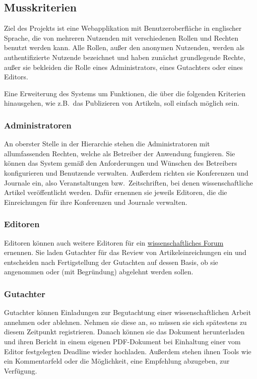 
\subsection{Musskriterien}
Ziel des Projekts ist eine Webapplikation mit Benutzeroberfläche in englischer Sprache, die von mehreren Nutzenden mit verschiedenen Rollen und Rechten benutzt werden kann.
Alle Rollen, außer den anonymen Nutzenden, werden als authentifizierte Nutzende bezeichnet und haben zunächst grundlegende Rechte, außer sie bekleiden die Rolle eines Administrators, eines Gutachters oder eines Editors.

Eine Erweiterung des Systems um Funktionen, die über die folgenden Kriterien hinausgehen, wie z.B.\ das Publizieren von Artikeln, soll einfach möglich sein.

\subsubsection{Administratoren}
An oberster Stelle in der Hierarchie stehen die Administratoren mit allumfassenden Rechten, welche als Betreiber der Anwendung fungieren.
Sie können das System gemäß den Anforderungen und Wünschen des Betreibers konfigurieren und Benutzende verwalten.
Außerdem richten sie Konferenzen und Journale ein, also Veranstaltungen bzw.\ Zeitschriften, bei denen wissenschaftliche Artikel veröffentlicht werden.
Dafür ernennen sie jeweils Editoren, die die Einreichungen für ihre Konferenzen und Journale verwalten.

\subsubsection{Editoren}
Editoren können auch weitere Editoren für ein \hyperref[glo:wissForum]{wissenschaftliches Forum} ernennen.
Sie laden Gutachter für das Review von Artikeleinreichungen ein und entscheiden nach Fertigstellung der Gutachten auf dessen Basis, ob sie angenommen oder (mit Begründung) abgelehnt werden sollen.

\subsubsection{Gutachter}
Gutachter können Einladungen zur Begutachtung einer wissenschaftlichen Arbeit annehmen oder ablehnen.
Nehmen sie diese an, so müssen sie sich spätestens zu diesem Zeitpunkt registrieren.
Danach können sie das Dokument herunterladen und ihren Bericht in einem eigenen PDF-Dokument bei Einhaltung einer vom Editor festgelegten Deadline wieder hochladen.
Außerdem stehen ihnen Tools wie ein Kommentarfeld oder die Möglichkeit, eine Empfehlung abzugeben, zur Verfügung.

